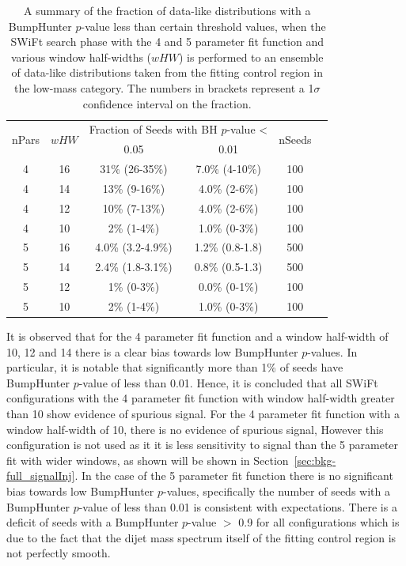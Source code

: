 \begin{table}[!ht]
\centering
\begin{tabular}{|c|c||c|c|c|c|}
  \hline
\multirow{2}{*}{nPars} & \multirow{2}{*}{$wHW$} &\multicolumn{2}{c|}{Fraction of Seeds with BH \mbox{$p$-value} \textless} &  \multirow{2}{*}{nSeeds} \\ \cline{3-4} 
                       &                     & 0.05                & 0.01            &        \\ 
  \hline
  4 &   16 &  31\%   (26-35\%)   &  7.0\% (4-10\%)  & 100  \\
  4 &   14 &  13\%   (9-16\%)    &  4.0\% (2-6\%)   & 100  \\
  4 &   12 &  10\%   (7-13\%)    &  4.0\% (2-6\%)   & 100  \\
  4 &   10 &  2\%   (1-4\%)      &  1.0\% (0-3\%)   & 100  \\
  \hline
  5 &   16 &  4.0\% (3.2-4.9\%)  &  1.2\% (0.8-1.8) & 500  \\
  5 &   14 &  2.4\% (1.8-3.1\%)  &  0.8\% (0.5-1.3) & 500  \\
  5 &   12 &  1\%   (0-3\%)      &  0.0\%  (0-1\%)  & 100  \\
  5 &   10 &  2\%   (1-4\%)      &  1.0\%  (0-3\%)  & 100  \\
  \hline
\end{tabular}

\caption{\label{tab:bumpH_lm_spuriousSignal}
  A summary of the fraction of data-like distributions 
  with a {\sc BumpHunter} \mbox{$p$-value} less than certain threshold values,
  when the SWiFt search phase with the 4 and 5 parameter fit function
  and various window half-widths ($wHW$) is performed to an ensemble of data-like distributions
  taken from the fitting control region in the low-mass category.
  The numbers in brackets represent a 1$\sigma$ confidence interval on the fraction.}
\end{table}


It is observed that for the 4 parameter fit function and a window half-width of 10, 12 and 14 there is a clear bias towards
low {\sc BumpHunter} \mbox{$p$-value}s.
In particular, it is notable that significantly more than 1\% of seeds have {\sc BumpHunter} \mbox{$p$-value} of less than 0.01.
Hence, it is concluded that all SWiFt configurations with the 4 parameter fit function with window half-width greater than 10
show evidence of spurious signal.
For the 4 parameter fit function with a window half-width of 10, there is no evidence of spurious signal,
However this configuration is not used as it it is less sensitivity to signal than the 5 parameter fit with wider windows, as shown will be shown in Section~\ref{sec:bkg-full_signalInj}.
In the case of the 5 parameter fit function there is no significant bias towards low {\sc BumpHunter} \mbox{$p$-value}s,
specifically the number of seeds with a {\sc BumpHunter} \mbox{$p$-value} of less than 0.01 is consistent with expectations.
There is a deficit of seeds with a BumpHunter $p$-value $>$ 0.9 for all configurations which is due to the fact that the
dijet mass spectrum itself of the fitting control region is not perfectly smooth.

